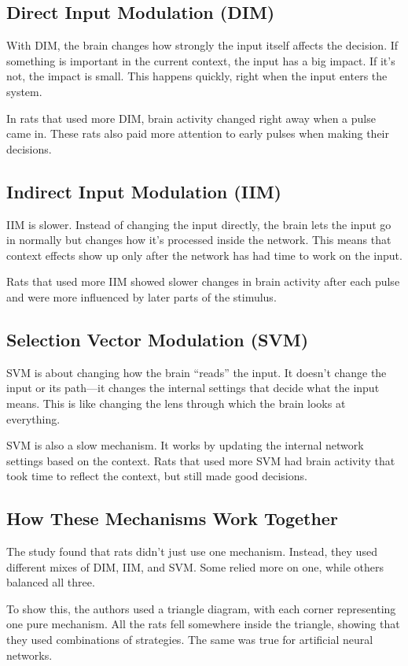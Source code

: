 \documentclass{article}
\begin{document}
\subsection{Direct Input Modulation (DIM)}
With DIM, the brain changes how strongly the input itself affects the decision. If something is important in the current context, the input has a big impact. If it’s not, the impact is small. This happens quickly, right when the input enters the system.

In rats that used more DIM, brain activity changed right away when a pulse came in. These rats also paid more attention to early pulses when making their decisions.

\subsection{Indirect Input Modulation (IIM)}
IIM is slower. Instead of changing the input directly, the brain lets the input go in normally but changes how it’s processed inside the network. This means that context effects show up only after the network has had time to work on the input.

Rats that used more IIM showed slower changes in brain activity after each pulse and were more influenced by later parts of the stimulus.

\subsection{Selection Vector Modulation (SVM)}
SVM is about changing how the brain “reads” the input. It doesn’t change the input or its path—it changes the internal settings that decide what the input means. This is like changing the lens through which the brain looks at everything.

SVM is also a slow mechanism. It works by updating the internal network settings based on the context. Rats that used more SVM had brain activity that took time to reflect the context, but still made good decisions.

\subsection{How These Mechanisms Work Together}
The study found that rats didn’t just use one mechanism. Instead, they used different mixes of DIM, IIM, and SVM. Some relied more on one, while others balanced all three.

To show this, the authors used a triangle diagram, with each corner representing one pure mechanism. All the rats fell somewhere inside the triangle, showing that they used combinations of strategies. The same was true for artificial neural networks.
\end{document}

